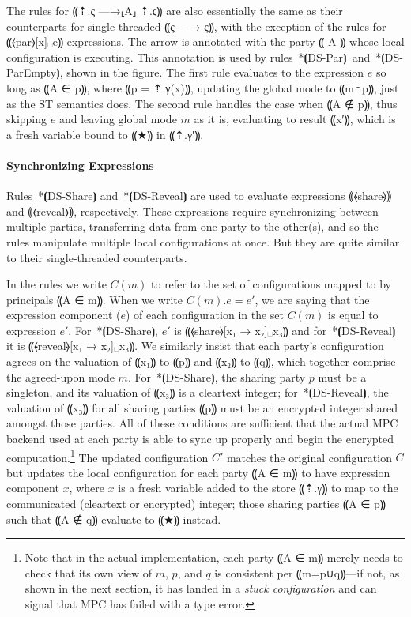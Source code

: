 The rules for ⸨⇡.ς —→⸤A⸥ ⇡.ς⸩ are also essentially the same as their
counterparts for single-threaded ⸨ς —→ ς⸩, with the exception of the rules for
⸨⦑par⦒[x]␣e⸩ expressions. The arrow is annotated with the party ⸨ A ⸩
whose local configuration is executing. This annotation is used by
rules~*⦗DS-Par⦘~and~*⦗DS-ParEmpty⦘, shown in the figure. The first rule evaluates to the
expression $e$ so long as ⸨A ∈ p⸩, where ⸨p = ⇡.γ(x)⸩, updating the
global mode to ⸨m∩p⸩, just as the ST semantics does. The second rule
handles the case when ⸨A ∉ p⸩, thus skipping $e$ and leaving global
mode $m$ as it is, evaluating to result ⸨x′⸩, which is a fresh
variable bound to ⸨★⸩ in ⸨⇡.γ′⸩.

\paragraph*{Synchronizing Expressions}
%
Rules~*⦗DS-Share⦘ and~*⦗DS-Reveal⦘ are used to evaluate expressions
⸨⦑share⦒⸩ and ⸨⦑reveal⦒⸩, respectively. These expressions require
synchronizing between multiple parties, transferring data from one
party to the other(s), and so the rules manipulate multiple local
configurations at once. But they are quite similar to their
single-threaded counterparts.

In the rules we write $C(m)$ to refer to the set of configurations
mapped to by principals ⸨A ∈ m⸩. When we write $C(m).e = e'$, we are
saying that the expression component ($e$) of each configuration in
the set $C(m)$ is equal to expression $e'$. For~*⦗DS-Share⦘, $e'$ is
⸨⦑share⦒[x₁ → x₂]␣x₃⸩ and for~*⦗DS-Reveal⦘ it is ⸨⦑reveal⦒[x₁ →
x₂]␣x₃⸩. We similarly insist that each party's configuration agrees on
the valuation of ⸨x₁⸩ to ⸨p⸩ and ⸨x₂⸩ to ⸨q⸩, which together comprise
the agreed-upon mode $m$. For~*⦗DS-Share⦘, the sharing party $p$ must
be a singleton, and its valuation of ⸨x₃⸩ is a cleartext integer;
for~*⦗DS-Reveal⦘, the valuation of ⸨x₃⸩ for all sharing parties ⸨p⸩
must be an encrypted integer shared amongst those parties. All of
these conditions are sufficient that the actual MPC backend used at
each party is able to sync up properly and begin the encrypted
computation.\footnote{Note that in the actual implementation, each
  party ⸨A ∈ m⸩ merely needs to check that its own view of $m$, $p$,
  and $q$ is consistent per ⸨m=p∪q⸩---if not, as shown in the next
  section, it has landed in a \emph{stuck configuration} and can
  signal that MPC has failed with a type error.} The updated
configuration $C'$ matches the original
configuration $C$ but updates the local configuration for each party
⸨A ∈ m⸩ to have expression component $x$, where $x$ is a fresh
variable added to the store ⸨⇡.γ⸩ to map to the communicated
(cleartext or encrypted) integer; those sharing parties ⸨A ∈ p⸩ such
that ⸨A ∉ q⸩ evaluate to ⸨★⸩ instead.

